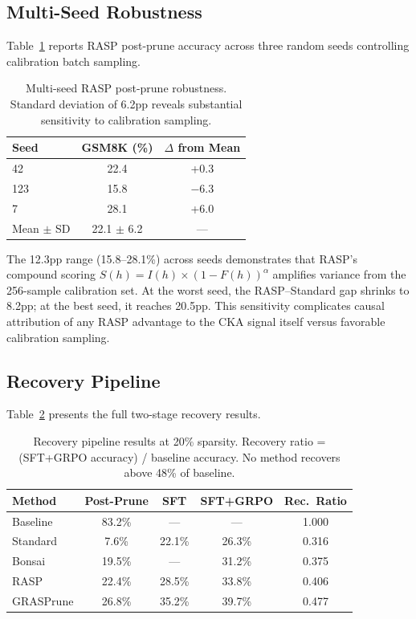 \documentclass[11pt,a4paper]{article}
\begin{document}
\subsection{Multi-Seed Robustness}
\label{sec:multiseed}

Table~\ref{tab:multiseed} reports RASP post-prune accuracy across three random seeds controlling calibration batch sampling.

\begin{table}[t]
\centering
\small
\begin{tabular}{lcc}
\toprule
\textbf{Seed} & \textbf{GSM8K (\%)} & \textbf{$\Delta$ from Mean} \\
\midrule
42 & 22.4 & +0.3 \\
123 & 15.8 & $-$6.3 \\
7 & 28.1 & +6.0 \\
\midrule
Mean $\pm$ SD & 22.1 $\pm$ 6.2 & --- \\
\bottomrule
\end{tabular}
\caption{Multi-seed RASP post-prune robustness. Standard deviation of 6.2pp reveals substantial sensitivity to calibration sampling.}
\label{tab:multiseed}
\end{table}

The 12.3pp range (15.8--28.1\%) across seeds demonstrates that RASP's compound scoring $S(h) = I(h) \times (1-F(h))^\alpha$ amplifies variance from the 256-sample calibration set.
At the worst seed, the RASP--Standard gap shrinks to 8.2pp; at the best seed, it reaches 20.5pp.
This sensitivity complicates causal attribution of any RASP advantage to the CKA signal itself versus favorable calibration sampling.

\subsection{Recovery Pipeline}
\label{sec:recovery_results}

Table~\ref{tab:recovery} presents the full two-stage recovery results.

\begin{table}[t]
\centering
\small
\begin{tabular}{lcccc}
\toprule
\textbf{Method} & \textbf{Post-Prune} & \textbf{SFT} & \textbf{SFT+GRPO} & \textbf{Rec.\ Ratio} \\
\midrule
Baseline & 83.2\% & --- & --- & 1.000 \\
\midrule
Standard & 7.6\% & 22.1\% & 26.3\% & 0.316 \\
Bonsai & 19.5\% & --- & 31.2\% & 0.375 \\
RASP & 22.4\% & 28.5\% & 33.8\% & 0.406 \\
GRASPrune & 26.8\% & 35.2\% & 39.7\% & 0.477 \\
\bottomrule
\end{tabular}
\caption{Recovery pipeline results at 20\% sparsity. Recovery ratio = (SFT+GRPO accuracy) / baseline accuracy. No method recovers above 48\% of baseline.}
\label{tab:recovery}
\end{table}
\end{document}
